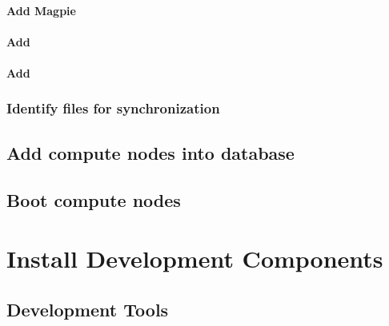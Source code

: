 \documentclass[letterpaper]{article}
\begin{document}
\paragraph{Add Magpie}


\paragraph{Add \conman{}} \label{sec:add_conman}


\paragraph{Add \nhc{}} \label{sec:add_nhc}



\subsubsection{Identify files for synchronization} \label{sec:file_import}




\vspace*{0.9cm}
\subsection{Add compute nodes into \xCAT{} database} \label{sec:xcat_add_nodes}


\vspace*{0.1cm}
\subsection{Boot compute nodes} \label{sec:boot_computes}


\section{Install \OHPC{} Development Components}


\vspace*{-0.15cm}
\subsection{Development Tools} \label{sec:install_dev_tools}


\vspace*{-0.15cm}
\end{document}
